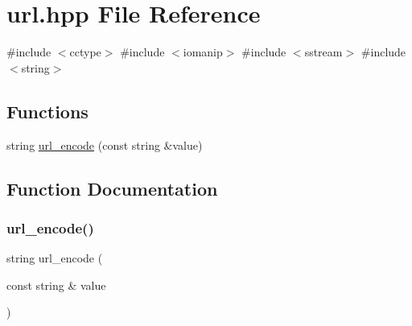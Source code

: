 \hypertarget{a00017}{}\section{url.\+hpp File Reference}
\label{a00017}
{\ttfamily \#include $<$cctype$>$}\newline
{\ttfamily \#include $<$iomanip$>$}\newline
{\ttfamily \#include $<$sstream$>$}\newline
{\ttfamily \#include $<$string$>$}\newline
\subsection*{Functions}
\begin{DoxyCompactItemize}
\item 
string \hyperlink{a00017_a3d39a991e29c997a51241a5005127fe8}{url\+\_\+encode} (const string \&value)
\end{DoxyCompactItemize}


\subsection{Function Documentation}
\mbox{\label{a00017_a3d39a991e29c997a51241a5005127fe8}} 
\subsubsection{\texorpdfstring{url\+\_\+encode()}{url\_encode()}}
{\footnotesize\ttfamily string url\+\_\+encode (\begin{DoxyParamCaption}\item[{const string \&}]{value }\end{DoxyParamCaption})}

